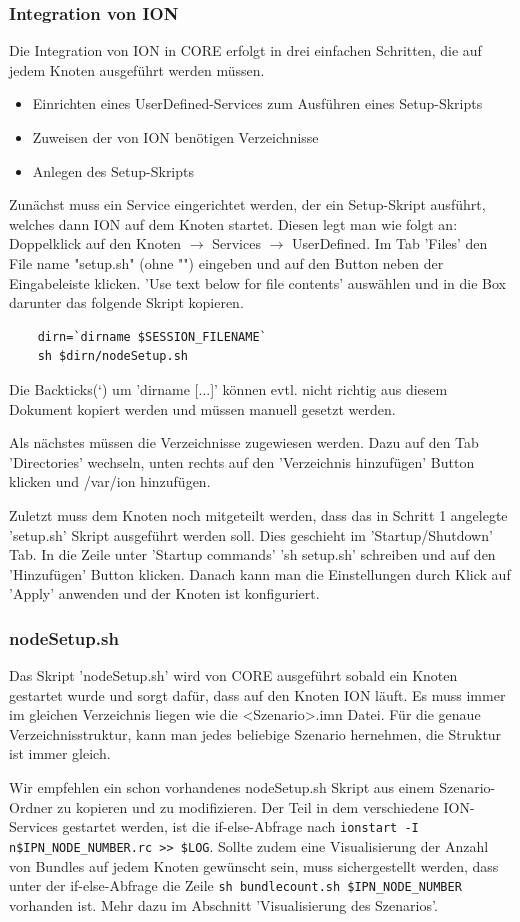 \documentclass{article}
\begin{document}
\subsubsection{Integration von ION}
Die Integration von ION in CORE erfolgt in drei einfachen Schritten, die auf jedem Knoten ausgeführt werden müssen.
\begin{itemize}
\item Einrichten eines UserDefined-Services zum Ausführen eines Setup-Skripts
\item Zuweisen der von ION benötigen Verzeichnisse
\item Anlegen des Setup-Skripts
\end{itemize}\par
Zunächst muss ein Service eingerichtet werden, der ein Setup-Skript ausführt, welches dann ION auf dem Knoten startet. Diesen legt man wie folgt an: Doppelklick auf den Knoten $\rightarrow$ Services $\rightarrow$ UserDefined. Im Tab 'Files'  den File name "setup.sh" (ohne "") eingeben und auf den Button neben der Eingabeleiste klicken. 'Use text below for file contents' auswählen und in die Box darunter das folgende Skript kopieren.
\begin{verbatim}
    dirn=`dirname $SESSION_FILENAME`
    sh $dirn/nodeSetup.sh
\end{verbatim}
Die Backticks(`) um 'dirname [...]' können evtl. nicht richtig aus diesem Dokument kopiert werden und müssen manuell gesetzt werden.\par
Als nächstes müssen die Verzeichnisse zugewiesen werden. Dazu auf den Tab 'Directories' wechseln, unten rechts auf den 'Verzeichnis hinzufügen' Button klicken und /var/ion hinzufügen.\par
Zuletzt muss dem Knoten noch mitgeteilt werden, dass das in Schritt 1 angelegte 'setup.sh' Skript ausgeführt werden soll. Dies geschieht im 'Startup/Shutdown' Tab. In die Zeile unter 'Startup commands' 'sh setup.sh' schreiben und auf den 'Hinzufügen' Button klicken. Danach kann man die Einstellungen durch Klick auf 'Apply' anwenden und der Knoten ist konfiguriert.
\subsubsection{nodeSetup.sh}
Das Skript 'nodeSetup.sh' wird von CORE ausgeführt sobald ein Knoten gestartet wurde und sorgt dafür, dass auf den Knoten ION läuft. Es muss immer im gleichen Verzeichnis liegen wie die <Szenario>.imn Datei. Für die genaue Verzeichnisstruktur, kann man jedes beliebige Szenario hernehmen, die Struktur ist immer gleich.\par
Wir empfehlen ein schon vorhandenes nodeSetup.sh Skript aus einem Szenario-Ordner zu kopieren und zu modifizieren. Der Teil in dem verschiedene ION-Services gestartet werden, ist die if-else-Abfrage nach \texttt{ionstart -I n\$IPN\_NODE\_NUMBER.rc >> \$LOG}. Sollte zudem eine Visualisierung der Anzahl von Bundles auf jedem Knoten gewünscht sein, muss sichergestellt werden, dass unter der if-else-Abfrage die Zeile \texttt{sh bundlecount.sh \$IPN\_NODE\_NUMBER} vorhanden ist. Mehr dazu im Abschnitt 'Visualisierung des Szenarios'.
\end{document}
